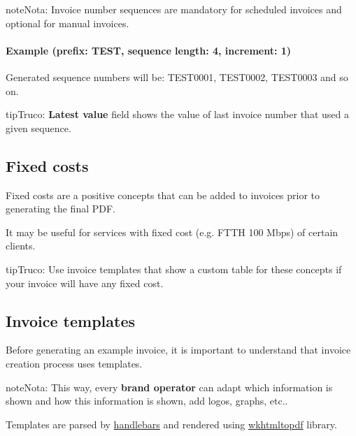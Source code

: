 \documentclass[letterpaper,10pt,spanish]{sphinxmanual}
\begin{document}
\begin{notice}{note}{Nota:}
Invoice number sequences are mandatory for scheduled invoices and optional for manual invoices.
\end{notice}
\paragraph{Example (prefix: TEST, sequence length: 4, increment: 1)}

Generated sequence numbers will be: TEST0001, TEST0002, TEST0003 and so on.

\begin{notice}{tip}{Truco:}
\textbf{Latest value} field shows the value of last invoice number that used a given sequence.
\end{notice}


\subsection{Fixed costs}
\label{administration_portal/brand/invoicing/fixed_costs:fixed-costs}\label{administration_portal/brand/invoicing/fixed_costs::doc}\label{administration_portal/brand/invoicing/fixed_costs:id1}
Fixed costs are a positive concepts that can be added to invoices prior to generating the final PDF.

It may be useful for services with fixed cost (e.g. FTTH 100 Mbps) of certain clients.

\begin{notice}{tip}{Truco:}
Use invoice templates that show a custom table for these concepts if your invoice will have any fixed cost.
\end{notice}


\subsection{Invoice templates}
\label{administration_portal/brand/invoicing/invoice_templates::doc}\label{administration_portal/brand/invoicing/invoice_templates:invoice-templates}
Before generating an example invoice, it is important to understand that invoice
creation process uses templates.

\begin{notice}{note}{Nota:}
This way, every \textbf{brand operator} can adapt which information
is shown and how this information is shown, add logos, graphs, etc..
\end{notice}

Templates are parsed by \href{https://github.com/XaminProject/handlebars.php}{handlebars} and rendered
using \href{https://wkhtmltopdf.org/}{wkhtmltopdf} library.
\end{document}
